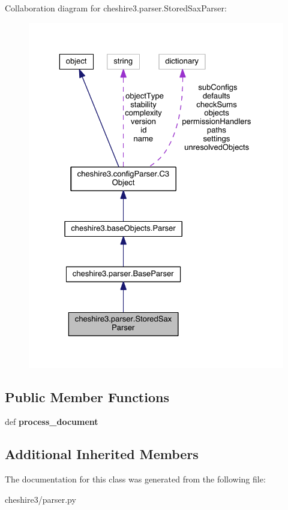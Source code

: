 Collaboration diagram for cheshire3.\-parser.\-Stored\-Sax\-Parser\-:
\nopagebreak
\begin{figure}[H]
\begin{center}
\leavevmode
\includegraphics[width=325pt]{classcheshire3_1_1parser_1_1_stored_sax_parser__coll__graph}
\end{center}
\end{figure}
\subsection*{Public Member Functions}
\begin{DoxyCompactItemize}
\item 
\hypertarget{classcheshire3_1_1parser_1_1_stored_sax_parser_a9ce4023fb2b3b1a5327f9e2f9f155843}{def {\bfseries process\-\_\-document}}\label{classcheshire3_1_1parser_1_1_stored_sax_parser_a9ce4023fb2b3b1a5327f9e2f9f155843}

\end{DoxyCompactItemize}
\subsection*{Additional Inherited Members}


The documentation for this class was generated from the following file\-:\begin{DoxyCompactItemize}
\item 
cheshire3/parser.\-py\end{DoxyCompactItemize}
